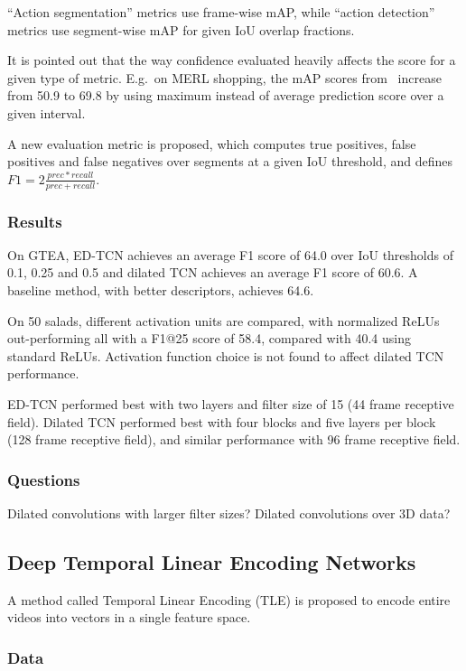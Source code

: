 \documentclass[a4paper, 12pt]{article}
\begin{document}
``Action segmentation'' metrics use frame-wise mAP, while ``action detection''
metrics use segment-wise mAP for given IoU overlap fractions.

It is pointed out that the way confidence evaluated heavily affects the score
for a given type of metric. E.g.\ on MERL shopping, the mAP scores
from~\citet{merl-shopping-singh} increase from 50.9 to 69.8 by using maximum
instead of average prediction score over a given interval.

A new evaluation metric is proposed, which computes true positives, false
positives and false negatives over segments at a given IoU threshold, and defines
$F1 = 2\frac{prec * recall}{prec + recall}$.

\subsubsection{Results}

On GTEA, ED-TCN achieves an average F1 score of 64.0 over IoU thresholds of
0.1, 0.25 and 0.5 and dilated TCN achieves an average F1 score of 60.6. A
baseline method, with better descriptors, achieves 64.6.

On 50 salads, different activation units are compared, with normalized ReLUs
out-performing all with a F1@25 score of 58.4, compared with 40.4 using
standard ReLUs. Activation function choice is not found to affect dilated TCN
performance.

ED-TCN performed best with two layers and filter size of 15 (44 frame receptive
field). Dilated TCN performed best with four blocks and five layers per block
(128 frame receptive field), and similar performance with 96 frame receptive
field.

\subsubsection{Questions}

Dilated convolutions with larger filter sizes? Dilated convolutions over 3D
data?


\subsection{Deep Temporal Linear Encoding
            Networks\citet{DBLP:journals/corr/DibaSG16}}

A method called Temporal Linear Encoding (TLE) is proposed to encode entire
videos into vectors in a single feature space.

\subsubsection{Data}
\end{document}
